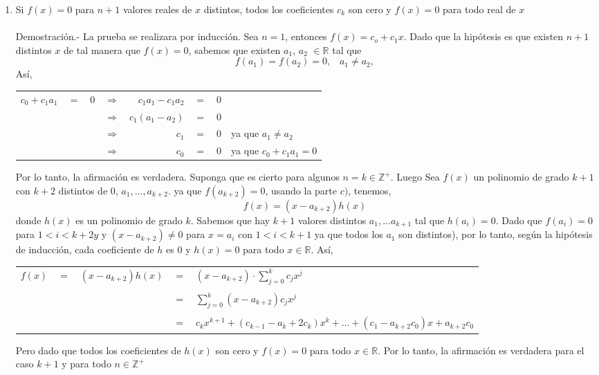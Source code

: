 \begin{teo}
\begin{enumerate}[\bfseries a)]
\item Si $f(x)=0$ para $n+1$ valores reales de $x$ distintos, todos los coeficientes $c_k$ son cero y $f(x)=0$ para todo real de $x$\\\\
Demostración.- \;  La prueba se realizara por inducción. Sea $n=1$, entonces $f(x)=c_o + c_1 x$. Dado que la hipótesis es que existen $n+1$ distintos  $x$ de tal manera que $f(x)=0$, sabemos que existen $a_1$, $a_2$ $\in \mathbb{R}$ tal que $$f(a_1)=f(a_2)=0, \; \; \; a_1 \neq a_2,$$ Así, 
\begin{center}
\begin{tabular}{r c l c r c l l}
$c_0 + c_1 a_1$&$=$&$0$&$\Rightarrow$&$c_1 a_1 - c_1 a_2$&$=$&$0$&\\
&&&$\Rightarrow$&$c_1(a_1 - a_2)$&$=$&$0$&\\
&&&$\Rightarrow$&$c_1$&$=$&$0$& ya que $a_1 \neq a_2$\\
&&&$\Rightarrow$&$c_0$&$=$&$0$&ya que $c_0 + c_1 a_1 = 0$\\
\end{tabular}
\end{center}
Por lo tanto, la afirmación es verdadera. Suponga que es cierto para algunos $n=k \in \mathbb{Z}^{+}$. Luego Sea $f(x)$ un polinomio de grado $k+1$ con $k+2$ distintos de $0$, $a_1,...,a_{k+2}.$ ya que $f(a_{k+2}) = 0$, usando la parte $c)$, tenemos, $$f(x)=(x- a_{k+2})h(x)$$
donde $h(x)$ es un polinomio de grado $k$. Sabemos que hay $k+1$ valores distintos $a_1,... a_{k+1}$ tal que  $h(a_i) = 0.$ Dado que $f(a_i)=0$ para $1< i < k+2y$ y $(x- a_{k+2}) \neq 0$ para $x=a_i$ con $1 < i < k+1$ ya que todos los $a_1$ son distintos), por lo tanto, según la hipótesis de inducción, cada coeficiente de $h$ es $0$ y $h(x)=0$ para todo $x \in \mathbb{R}.$ Así,
\begin{center}
\begin{tabular}{r c r c l}
$f(x)$&$=$&$(x - a_{k+2})h(x)$&$=$&$(x- a_{k+2}) \cdot \displaystyle\sum_{j=0}^k c_j x^j$\\\\
&&&$=$&$\displaystyle\sum_{j=0}^k (x - a_{k+2})c_j x^j$\\\\
&&&$=$&$c_k x^{k+1} + (c_{k-1} - a_k + 2c_k)x^k + ... + (c_1 -a_{k+2} c_0)x + a_{k+2} c_0$\\
\end{tabular}
\end{center}
Pero dado que todos los coeficientes de $h(x)$ son cero y $f(x) = 0$ para todo $x \in \mathbb{R}$. Por lo tanto, la afirmación es verdadera para el caso $k+1$ y para todo $n \in \mathbb{Z}^+$\\\\


\end{enumerate}
\end{teo}
